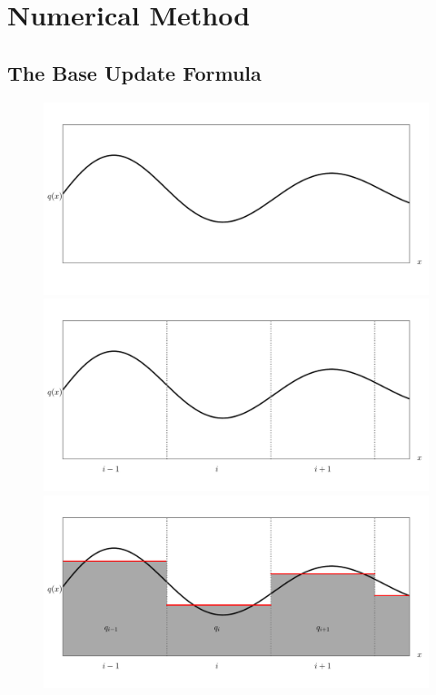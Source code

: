\section{Numerical Method}\label{chap:advection-pwconst}


\subsection{The Base Update Formula}

\begin{figure}[htbp]
	\includegraphics[width=.9\textwidth]{./figures/q_of_x.pdf}\\%
	\includegraphics[width=.9\textwidth]{./figures/adding_cells.pdf}\\%
	\includegraphics[width=.9\textwidth]{./figures/piecewise_const.pdf}%

\end{figure}
